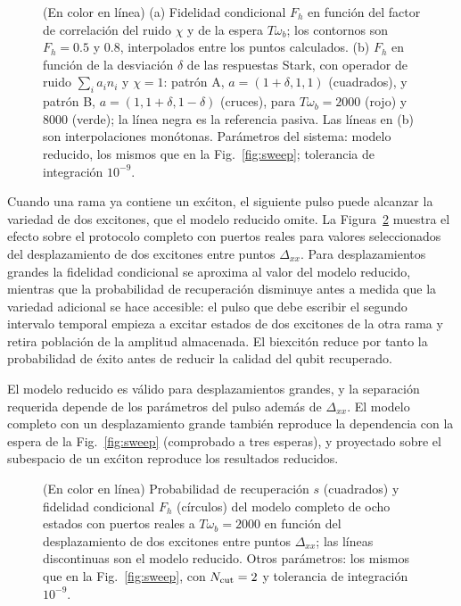 \documentclass[aps,pra,twocolumn,groupedaddress,amsmath,amssymb,floatfix]{revtex4-2}
\begin{document}
\begin{figure}[t]
\centering
\resizebox{\columnwidth}{!}{}
\caption{(En color en l\'inea) (a) Fidelidad condicional $F_h$ en funci\'on del factor de correlaci\'on del ruido $\chi$ y de la espera $T\omega_b$; los contornos son $F_h=0.5$ y $0.8$, interpolados entre los puntos calculados. (b) $F_h$ en funci\'on de la desviaci\'on $\delta$ de las respuestas Stark, con operador de ruido $\sum_i a_i n_i$ y $\chi=1$: patr\'on A, $a=(1+\delta,1,1)$ (cuadrados), y patr\'on B, $a=(1,1+\delta,1-\delta)$ (cruces), para $T\omega_b=2000$ (rojo) y $8000$ (verde); la l\'inea negra es la referencia pasiva. Las l\'ineas en (b) son interpolaciones mon\'otonas. Par\'ametros del sistema: modelo reducido, los mismos que en la Fig.~\ref{fig:sweep}; tolerancia de integraci\'on $10^{-9}$.}
\label{fig:requirements}
\end{figure}

Cuando una rama ya contiene un ex\'citon, el siguiente pulso puede alcanzar la variedad de dos excitones, que el modelo reducido omite. La Figura~\ref{fig:biexciton} muestra el efecto sobre el protocolo completo con puertos reales para valores seleccionados del desplazamiento de dos excitones entre puntos $\Delta_{xx}$. Para desplazamientos grandes la fidelidad condicional se aproxima al valor del modelo reducido, mientras que la probabilidad de recuperaci\'on disminuye antes a medida que la variedad adicional se hace accesible: el pulso que debe escribir el segundo intervalo temporal empieza a excitar estados de dos excitones de la otra rama y retira poblaci\'on de la amplitud almacenada. El biexcit\'on reduce por tanto la probabilidad de \'exito antes de reducir la calidad del qubit recuperado.

El modelo reducido es v\'alido para desplazamientos grandes, y la separaci\'on requerida depende de los par\'ametros del pulso adem\'as de $\Delta_{xx}$. El modelo completo con un desplazamiento grande tambi\'en reproduce la dependencia con la espera de la Fig.~\ref{fig:sweep} (comprobado a tres esperas), y proyectado sobre el subespacio de un ex\'citon reproduce los resultados reducidos.

\begin{figure}[h]
\centering
\resizebox{0.6\columnwidth}{!}{}
\caption{(En color en l\'inea) Probabilidad de recuperaci\'on $s$ (cuadrados) y fidelidad condicional $F_h$ (c\'irculos) del modelo completo de ocho estados con puertos reales a $T\omega_b=2000$ en funci\'on del desplazamiento de dos excitones entre puntos $\Delta_{xx}$; las l\'ineas discontinuas son el modelo reducido. Otros par\'ametros: los mismos que en la Fig.~\ref{fig:sweep}, con $N_{\rm cut}=2$ y tolerancia de integraci\'on $10^{-9}$.}
\label{fig:biexciton}
\end{figure}
\end{document}
